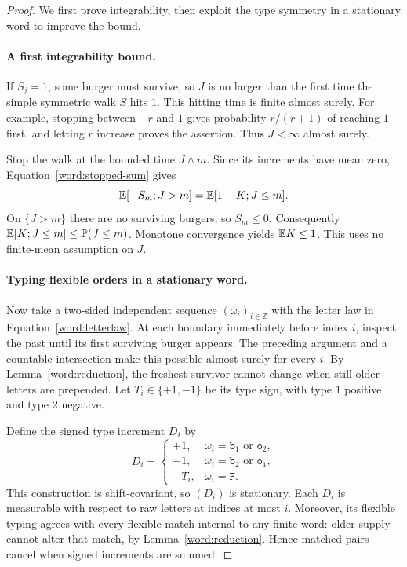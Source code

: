 \begin{proof}
We first prove integrability, then exploit the type symmetry in a
stationary word to improve the bound.

\paragraph{A first integrability bound.}
If $S_j=1$, some burger must survive, so $J$ is no larger than the first
time the simple symmetric walk $S$ hits $1$. This hitting time is finite
almost surely. For example, stopping between $-r$ and $1$ gives
probability $r/(r+1)$ of reaching $1$ first, and letting $r$ increase
proves the assertion. Thus $J<\infty$ almost surely.

Stop the walk at the bounded time $J\wedge m$. Since its increments
have mean zero, Equation~\eqref{word:stopped-sum} gives
\begin{equation}\label{word:optional-stopping}
 \mathbb E[-S_m;J>m]=\mathbb E[1-K;J\le m].
\end{equation}
On $\{J>m\}$ there are no surviving burgers, so $S_m\le0$.
Consequently $\mathbb E[K;J\le m]\le\mathbb P(J\le m)$. Monotone convergence yields
$\mathbb E K\le1$. This uses no finite-mean assumption on $J$.

\paragraph{Typing flexible orders in a stationary word.}
Now take a two-sided independent sequence $(\omega_i)_{i\in\mathbb Z}$
with the letter law in Equation~\eqref{word:letterlaw}. At each boundary
immediately before index $i$, inspect the past until its first surviving
burger appears. The preceding argument and a countable intersection
make this possible almost surely for every $i$. By
Lemma~\ref{word:reduction}, the freshest survivor cannot change when
still older letters are prepended. Let $T_i\in\{+1,-1\}$ be its type
sign, with type 1 positive and type 2 negative.

Define the signed type increment $D_i$ by
\[
 D_i=
 \begin{cases}
 +1,&\omega_i=\mathtt b_1\text{ or }\mathtt o_2,\\
 -1,&\omega_i=\mathtt b_2\text{ or }\mathtt o_1,\\
 -T_i,&\omega_i=\mathtt F.
 \end{cases}
\]
This construction is shift-covariant, so $(D_i)$ is stationary. Each
$D_i$ is measurable with respect to raw letters at indices at most $i$.
Moreover, its flexible typing agrees with every flexible match internal
to any finite word: older supply cannot alter that match, by
Lemma~\ref{word:reduction}. Hence matched pairs cancel when signed
increments are summed.


\end{proof}
